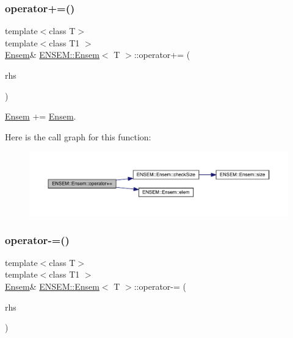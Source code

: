 \subsubsection{\texorpdfstring{operator+=()}{operator+=()}\hspace{0.1cm}{\footnotesize\ttfamily [6/6]}}
{\footnotesize\ttfamily template$<$class T$>$ \\
template$<$class T1 $>$ \\
\mbox{\hyperlink{classENSEM_1_1Ensem}{Ensem}}\& \mbox{\hyperlink{classENSEM_1_1Ensem}{E\+N\+S\+E\+M\+::\+Ensem}}$<$ T $>$\+::operator+= (\begin{DoxyParamCaption}\item[{const \mbox{\hyperlink{classENSEM_1_1Ensem}{Ensem}}$<$ T1 $>$ \&}]{rhs }\end{DoxyParamCaption})\hspace{0.3cm}{\ttfamily [inline]}}



\mbox{\hyperlink{classENSEM_1_1Ensem}{Ensem}} += \mbox{\hyperlink{classENSEM_1_1Ensem}{Ensem}}. 

Here is the call graph for this function\+:
\nopagebreak
\begin{figure}[H]
\begin{center}
\leavevmode
\includegraphics[width=350pt]{d7/d3e/classENSEM_1_1Ensem_ae24bd27a7f5a8ffed6ad4361956596fd_cgraph}
\end{center}
\end{figure}
\mbox{\label{classENSEM_1_1Ensem_a33710df08404883ee7790d2b67542971}} 
\subsubsection{\texorpdfstring{operator-\/=()}{operator-=()}\hspace{0.1cm}{\footnotesize\ttfamily [1/6]}}
{\footnotesize\ttfamily template$<$class T$>$ \\
template$<$class T1 $>$ \\
\mbox{\hyperlink{classENSEM_1_1Ensem}{Ensem}}\& \mbox{\hyperlink{classENSEM_1_1Ensem}{E\+N\+S\+E\+M\+::\+Ensem}}$<$ T $>$\+::operator-\/= (\begin{DoxyParamCaption}\item[{const \mbox{\hyperlink{classENSEM_1_1EScalar}{E\+Scalar}}$<$ T1 $>$ \&}]{rhs }\end{DoxyParamCaption})\hspace{0.3cm}{\ttfamily [inline]}}



